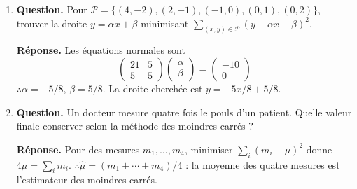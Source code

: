 \documentclass[12pt, a4paper]{article}
\begin{document}
\begin{enumerate}[label=8.\arabic*., start=70]
\begin{minipage}[t]{\linewidth}
\begin{enumerate}[\arabic*.]
  \item \textbf{Question.} Est-ce aussi le cas pour $a^{\prime},b^{\prime},c^{\prime}$ ?
\par\smallskip
\textbf{Réponse.} Oui : les vecteurs obtenus sont des combinaisons de $a,b,c$, donc appartiennent encore à $d^\perp$.

  \item \textbf{Question.} Compléter $(a^{\prime},b^{\prime},c^{\prime})$ en une base orthonormée de $\RR^4$. Est-elle unique ?
\par\smallskip
\textbf{Réponse.} Compléter par $d/2$. Pour les trois premiers vecteurs fixés, les seuls choix sont $d/2$ et $-d/2$ : la base n'est pas unique.

\end{enumerate}
\end{minipage}

  \item \begin{minipage}[t]{\linewidth}\raggedright
\textbf{Question.} Pour $\mathcal P=\{(4,-2),(2,-1),(-1,0),(0,1),(0,2)\}$, trouver la droite $y=\alpha x+\beta$ minimisant $\sum_{(x,y)\in\mathcal P}(y-\alpha x-\beta)^2$.
\par\smallskip
\textbf{Réponse.} Les équations normales sont
    \[
      \begin{pmatrix}21&5\\5&5\end{pmatrix}\begin{pmatrix}\alpha\\\beta\end{pmatrix}
      =\begin{pmatrix}-10\\0\end{pmatrix}
    \]
    $\therefore\alpha=-5/8$, $\beta=5/8$.
    La droite cherchée est $y=-5x/8+5/8$.
\end{minipage}

  \item \begin{minipage}[t]{\linewidth}\raggedright
\textbf{Question.} Un docteur mesure quatre fois le pouls d’un patient. Quelle valeur finale conserver selon la méthode des moindres carrés ?
\par\smallskip
\textbf{Réponse.} Pour des mesures $m_1,\ldots,m_4$, minimiser $\sum_i(m_i-\mu)^2$ donne
    $4\mu=\sum_i m_i$.
    $\therefore\widehat\mu=(m_1+\cdots+m_4)/4$ : la moyenne des quatre mesures est l'estimateur des moindres carrés.
\end{minipage}


\end{enumerate}
\end{document}
